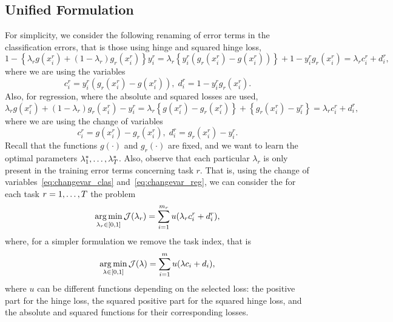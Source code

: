 \subsection{Unified Formulation}
For simplicity, we consider the following renaming of error terms in the classification errors, that is those using hinge and squared hinge loss,
\begin{equation}\nonumber
    1 - \left\{\lambda_r g(x_i^r) + (1-\lambda_r) g_r(x_i^r)  \right\} y_i^r = \lambda_r \left\{ y_i^r (g_r(x_i^r) - g(x_i^r)) \right\} +  1 - y_i^r g_r(x_i^r) 
     = \lambda_r c_i^r + d_i^r ,
\end{equation}
where we are using the variables
\begin{equation}
    \label{eq:changevar_clas}
    c_i^r =  y_i^r (g_r(x_i^r) - g(x_i^r))  , \;  d_i^r =  1 - y_i^r g_r(x_i^r) .
\end{equation}
Also, for regression, where the absolute and squared losses are used,
\begin{equation}\nonumber
    \lambda_r g(x_i^r) + (1-\lambda_r)g_r(x_i^r) - y_i^r = \lambda_r \left\{g(x_i^r) - g_r(x_i^r) \right\} + \left\{g_r(x_i^r) - y_i^r \right\} 
    = \lambda_r c_i^r + d_i^r,
\end{equation}
where we are using the change of variables
\begin{equation}
    \label{eq:changevar_reg}
    c_i^r = g(x_i^r) - g_r(x_i^r)  , \;  d_i^r =  g_r(x_i^r) - y_i^r .
\end{equation}
Recall that the functions $g(\cdot)$ and $g_r(\cdot)$ are fixed, and we want to learn the optimal parameters $\lambda_1^*, \ldots, \lambda_T^*$. Also, observe that each particular $\lambda_r$ is only present in the training error terms concerning task $r$. That is, using the change of variables~\eqref{eq:changevar_clas} and~\eqref{eq:changevar_reg}, we can consider the for each task $r=1, \ldots, T$ the problem
\begin{equation}
    \nonumber
    \operatorname*{arg\min}_{\lambda_r \in [0, 1]} \mathcal{J}(\lambda_r) = \sum_{i=1}^{m_r} u(\lambda_r c_i^r + d_i^r),
\end{equation}
where, for a simpler formulation we remove the task index, that is 
\begin{equation}
    \label{eq:subproblem_lambda}
    \argmin_{\lambda \in [0, 1]} \mathcal{J}(\lambda) = \sum_{i=1}^{\npertask} u(\lambda c_i + d_i),
\end{equation}
where $u$ can be different functions depending on the selected loss: the positive part for the hinge loss, the squared positive part for the squared hinge loss, and the absolute and squared functions for their corresponding losses.

